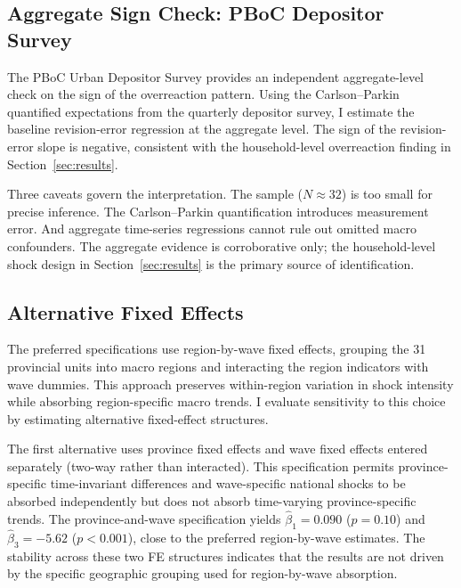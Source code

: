 \subsection{Aggregate Sign Check: PBoC Depositor Survey}%
\label{sec:pboc_sign}

The PBoC Urban Depositor Survey provides an independent
aggregate-level check on the sign of the overreaction pattern.
Using the Carlson--Parkin quantified expectations from the
quarterly depositor survey, I estimate the baseline
revision-error regression at the aggregate level.
The sign of the revision-error slope is negative,
consistent with the household-level overreaction finding in
Section~\ref{sec:results}.

Three caveats govern the interpretation.
The sample ($N \approx 32$) is too small for precise inference.
The Carlson--Parkin quantification introduces
measurement error.
And aggregate time-series regressions cannot rule out
omitted macro confounders.
The aggregate evidence is corroborative only; the
household-level shock design in Section~\ref{sec:results}
is the primary source of identification.

\subsection{Alternative Fixed Effects}\label{sec:altfe}

The preferred specifications use region-by-wave fixed
effects, grouping the 31 provincial units into macro
regions and interacting the region indicators with
wave dummies.
This approach preserves within-region variation in shock
intensity while absorbing region-specific macro trends.
I evaluate sensitivity to this choice by estimating
alternative fixed-effect structures.

The first alternative uses province fixed effects and
wave fixed effects entered separately (two-way rather than
interacted).
This specification permits province-specific time-invariant
differences and wave-specific national shocks to be absorbed
independently but does not absorb time-varying
province-specific trends.
The province-and-wave specification yields $\hat{\beta}_1
= 0.090$ ($p = 0.10$) and $\hat{\beta}_3 = -5.62$
($p < 0.001$), close to the preferred region-by-wave
estimates.
The stability across these two FE structures indicates that
the results are not driven by the specific geographic
grouping used for region-by-wave absorption.

